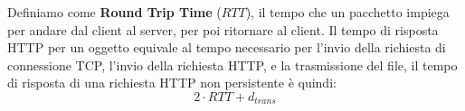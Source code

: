 \documentclass[12pt, letterpaper]{article}
\begin{document}
Definiamo come \textbf{Round Trip Time} ($RTT$), il tempo che un pacchetto impiega per andare dal client 
al server, per poi ritornare al client. Il tempo di risposta HTTP per un oggetto equivale al tempo necessario 
per l'invio della richiesta di connessione TCP, l'invio della richiesta HTTP, e la trasmissione del file, 
il tempo di risposta di una richiesta HTTP non persistente è quindi: $$2\cdot RTT + d_{trans}$$ 
 
\end{document}

